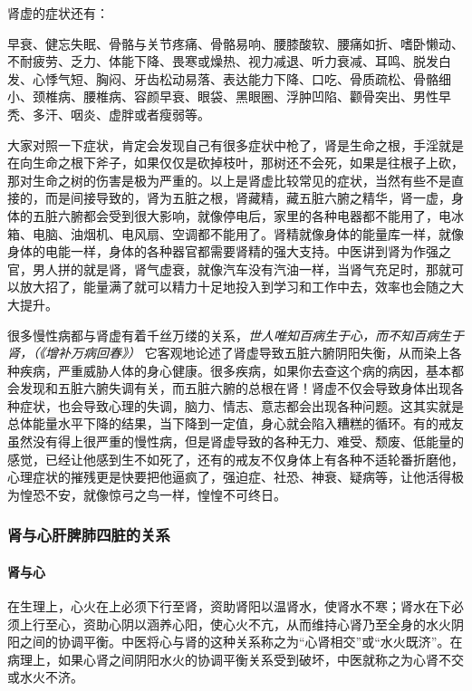 肾虚的症状还有：

早衰、健忘失眠、骨骼与关节疼痛、骨骼易响、腰膝酸软、腰痛如折、嗜卧懒动、不耐疲劳、乏力、体能下降、畏寒或燥热、视力减退、听力衰减、耳鸣、脱发白发、心悸气短、胸闷、牙齿松动易落、表达能力下降、口吃、骨质疏松、骨骼细小、颈椎病、腰椎病、容颜早衰、眼袋、黑眼圈、浮肿凹陷、颧骨突出、男性早秃、多汗、咽炎、虚胖或者瘦弱等。

大家对照一下症状，肯定会发现自己有很多症状中枪了，肾是生命之根，手淫就是在向生命之根下斧子，如果仅仅是砍掉枝叶，那树还不会死，如果是往根子上砍，那对生命之树的伤害是极为严重的。以上是肾虚比较常见的症状，当然有些不是直接的，而是间接导致的，肾为五脏之根，肾藏精，藏五脏六腑之精华，肾一虚，身体的五脏六腑都会受到很大影响，就像停电后，家里的各种电器都不能用了，电冰箱、电脑、油烟机、电风扇、空调都不能用了。肾精就像身体的能量库一样，就像身体的电能一样，身体的各种器官都需要肾精的强大支持。中医讲到肾为作强之官，男人拼的就是肾，肾气虚衰，就像汽车没有汽油一样，当肾气充足时，那就可以放大招了，能量满了就可以精力十足地投入到学习和工作中去，效率也会随之大大提升。

很多慢性病都与肾虚有着千丝万缕的关系，\textit{世人唯知百病生于心，而不知百病生于肾，（《增补万病回春》）} 它客观地论述了肾虚导致五脏六腑阴阳失衡，从而染上各种疾病，严重威胁人体的身心健康。很多疾病，如果你去查这个病的病因，基本都会发现和五脏六腑失调有关，而五脏六腑的总根在肾！肾虚不仅会导致身体出现各种症状，也会导致心理的失调，脑力、情志、意志都会出现各种问题。这其实就是总体能量水平下降的结果，当下降到一定值，身心就会陷入糟糕的循环。有的戒友虽然没有得上很严重的慢性病，但是肾虚导致的各种无力、难受、颓废、低能量的感觉，已经让他感到生不如死了，还有的戒友不仅身体上有各种不适轮番折磨他，心理症状的摧残更是快要把他逼疯了，强迫症、社恐、神衰、疑病等，让他活得极为惶恐不安，就像惊弓之鸟一样，惶惶不可终日。

\subsubsection{肾与心肝脾肺四脏的关系}

\paragraph{肾与心}

在生理上，心火在上必须下行至肾，资助肾阳以温肾水，使肾水不寒；肾水在下必须上行至心，资助心阴以涵养心阳，使心火不亢，从而维持心肾乃至全身的水火阴阳之间的协调平衡。中医将心与肾的这种关系称之为“心肾相交”或“水火既济”。在病理上，如果心肾之间阴阳水火的协调平衡关系受到破坏，中医就称之为心肾不交或水火不济。


